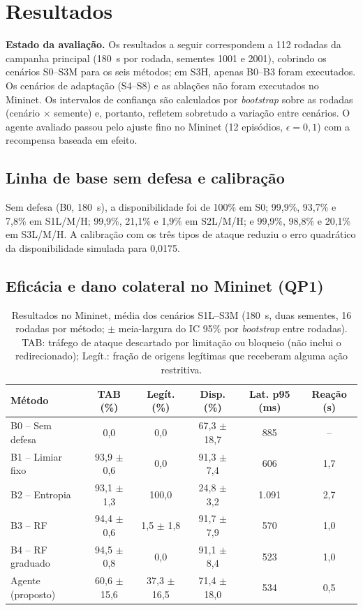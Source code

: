 \documentclass[12pt]{article}
\begin{document}
\section{Resultados}\label{sec:resultados}

\textbf{Estado da avaliação.} Os resultados a seguir correspondem a 112
rodadas da campanha principal (180~s por rodada, sementes 1001 e 2001),
cobrindo os cenários S0--S3M para os seis métodos; em S3H, apenas B0--B3
foram executados. Os cenários de adaptação (S4--S8) e as ablações não foram
executados no Mininet. Os intervalos de confiança são calculados por
\textit{bootstrap} sobre as rodadas (cenário $\times$ semente) e, portanto,
refletem sobretudo a variação entre cenários. O agente avaliado passou pelo
ajuste fino no Mininet (12 episódios, $\epsilon=0{,}1$) com a recompensa
baseada em efeito.

\subsection{Linha de base sem defesa e calibração}

Sem defesa (B0, 180~s), a disponibilidade foi de 100\% em S0; 99,9\%, 93,7\% e
7,8\% em S1L/M/H; 99,9\%, 21,1\% e 1,9\% em S2L/M/H; e 99,9\%, 98,8\% e 20,1\%
em S3L/M/H. A calibração com os três tipos de ataque reduziu o erro
quadrático da disponibilidade simulada para 0,0175.

\subsection{Eficácia e dano colateral no Mininet (QP1)}

\begin{table}[ht]
\centering
\caption{Resultados no Mininet, média dos cenários S1L--S3M
  (180~s, duas sementes, 16 rodadas por método; $\pm$ meia-largura do IC
  95\% por \textit{bootstrap} entre rodadas). TAB: tráfego de ataque descartado por limitação ou
  bloqueio (não inclui o redirecionado); Legít.: fração de origens legítimas
  que receberam alguma ação restritiva.}
\label{tab:res-eficacia}
\footnotesize
\begin{tabular}{@{}lccccc@{}}
\toprule
\textbf{Método} & \textbf{TAB (\%)} & \textbf{Legít. (\%)} &
\textbf{Disp. (\%)} & \textbf{Lat. p95 (ms)} & \textbf{Reação (s)} \\
\midrule
B0 -- Sem defesa & 0,0 & 0,0 & 67,3 $\pm$ 18,7 & 885 & -- \\
B1 -- Limiar fixo & 93,9 $\pm$ 0,6 & 0,0 & 91,3 $\pm$ 7,4 & 606 & 1,7 \\
B2 -- Entropia & 93,1 $\pm$ 1,3 & 100,0 & 24,8 $\pm$ 3,2 & 1.091 & 2,7 \\
B3 -- RF & 94,4 $\pm$ 0,6 & 1,5 $\pm$ 1,8 & 91,7 $\pm$ 7,9 & 570 & 1,0 \\
B4 -- RF graduado & 94,5 $\pm$ 0,8 & 0,0 & 91,1 $\pm$ 8,4 & 523 & 1,0 \\
Agente (proposto) & 60,6 $\pm$ 15,6 & 37,3 $\pm$ 16,5 & 71,4 $\pm$ 18,0 & 534 & 0,5 \\
\bottomrule
\end{tabular}
\end{table}
\end{document}
